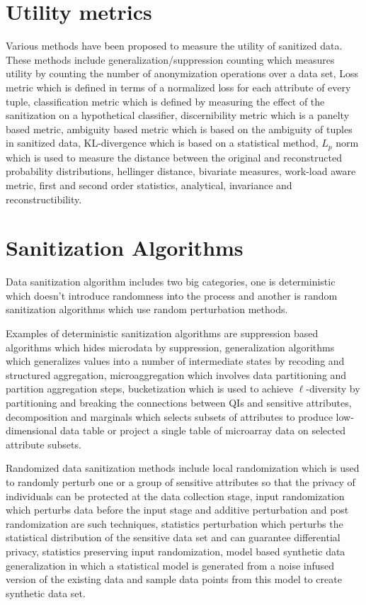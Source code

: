 \documentclass[12pt]{article}
\begin{document}
\section*{Utility metrics}
Various methods have been proposed to measure the utility of sanitized
data. These methods include generalization/suppression counting which
measures utility by counting the number of anonymization operations
over a data set, Loss metric which is defined in terms of a normalized
loss for each attribute of every tuple, classification metric which is
defined by measuring the effect of the sanitization on a hypothetical
classifier, discernibility metric which is a panelty based metric,
ambiguity based metric which is based on the ambiguity of tuples in
sanitized data, KL-divergence which is based on a statistical method,
$L_p$ norm which is used to measure the distance between the original
and reconstructed probability distributions, hellinger distance,
bivariate measures, work-load aware metric, first and second order
statistics, analytical, invariance and reconstructibility. 

\section*{Sanitization Algorithms}
Data sanitization algorithm includes two big categories, one is
deterministic which doesn't introduce randomness into the process and
another is random sanitization algorithms which use random
perturbation methods. 

Examples of deterministic sanitization algorithms are suppression
based algorithms which hides microdata by suppression, generalization
algorithms which generalizes values into a number of intermediate
states by recoding and structured aggregation, microaggregation which
involves data partitioning and partition aggregation steps,
bucketization which is used to achieve $\ell$-diversity by partitioning
and breaking the connections between QIs and sensitive attributes,
decomposition and marginals which selects subsets of attributes to
produce low-dimensional data table or project a single table of
microarray data on selected attribute subsets.  

Randomized data sanitization methods include local randomization which
is used to randomly perturb one or a group of sensitive attributes so
that the privacy of individuals can be protected at the data
collection stage, input randomization which perturbs data before the
input stage and additive perturbation and post randomization are such
techniques, statistics perturbation which perturbs the statistical
distribution of the sensitive data set and can guarantee differential
privacy, statistics preserving input randomization, model based
synthetic data generalization in which a statistical model is
generated from a noise infused version of the existing data and sample
data points from this model to create synthetic data set. 
\end{document}
